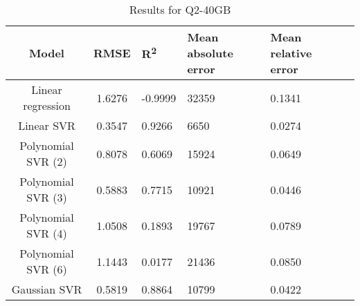 \begin{table}[H]
\centering
\begin{adjustbox}{center}
\begin{tabular}{c | c M{1.2cm} M{2.5cm} M{2.5cm} M{1.8cm}}
Model & RMSE & R\textsuperscript{2} & Mean absolute error & Mean relative error \tabularnewline
\hline
Linear regression & 1.6276 & -0.9999 &  32359 & 0.1341 \\
Linear SVR & 0.3547 & 0.9266 &   6650 & 0.0274 \\
Polynomial SVR (2) & 0.8078 & 0.6069 &  15924 & 0.0649 \\
Polynomial SVR (3) & 0.5883 & 0.7715 &  10921 & 0.0446 \\
Polynomial SVR (4) & 1.0508 & 0.1893 &  19767 & 0.0789 \\
Polynomial SVR (6) & 1.1443 & 0.0177 &  21436 & 0.0850 \\
Gaussian SVR & 0.5819 & 0.8864 &  10799 & 0.0422 \\
\end{tabular}
\end{adjustbox}
\\
\caption{Results for Q2-40GB}
\label{tab:all_linear_Q2_40}
\end{table}

